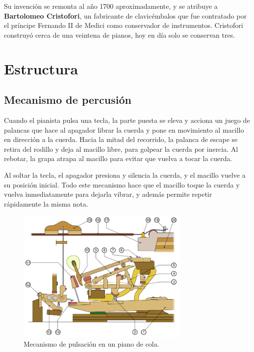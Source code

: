 \documentclass[10pt,a4paper]{article}
\begin{document}
	Su invención se remonta al año 1700 aproximadamente, y se atribuye a \textbf
	{Bartolomeo Cristofori}, un fabricante de clavicémbalos que fue  contratado 
	por el príncipe Fernando II de Medici como conservador de  instrumentos. 
	Cristofori construyó cerca de una veintena de pianos, hoy en día solo se 
	conservan tres.
	
	
	\clearpage
	\section{Estructura}
	
	\subsection{Mecanismo de percusión}
	
	Cuando el pianista pulsa una tecla, la parte puesta se eleva y acciona un 
	juego de palancas que hace al apagador librar la cuerda y pone en 
	movimiento al macillo en dirección a la cuerda. Hacia la mitad del 
	recorrido, la palanca de escape se retira del rodillo y deja al macillo 
	libre, para golpear la cuerda por inercia. Al rebotar, la grapa atrapa al 
	macillo para evitar que vuelva a tocar la cuerda.
	
	Al soltar la tecla, el apagador presiona y silencia la cuerda, y el macillo 
	vuelve a su posición inicial. Todo este mecanismo hace que el macillo 
	toque la cuerda y vuelva inmediatamente para dejarla vibrar, y además 
	permite repetir rápidamente la misma nota.
	
	\begin{figure}[!ht]
		\centering
		\includegraphics[width=0.75\textwidth]{images/pulsation}
		\caption[Mecanismo de pulsación]{\label{fig:pulsation} Mecanismo de pulsación en un piano de cola. \cite{pulsation}}
	\end{figure}
	
\end{document}
